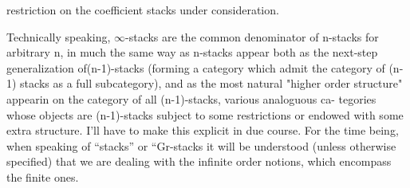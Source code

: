 restriction on the coefficient stacks under consideration.

 Technically speaking, $\infty$-stacks are the
common denominator of n-stacks for arbitrary n, in much the same way as
n-stacks appear both as the next-step generalization of(n-1)-stacks
(forming a category which admit the category of (n-1) stacks as a full
subcategory), and as the most natural "higher order structure" appearin
on the category of all  (n-1)-stacks,   various analoguous ca-
tegories whose objects are (n-1)-stacks subject to some restrictions or
endowed with some extra structure\hand{)}. I'll have to make this explicit in
due course. For the time being, when speaking of ``stacks'' or ``Gr-stacks
it will be understood (unless otherwise specified) that we are dealing
with the infinite order notions, which encompass the finite ones.


